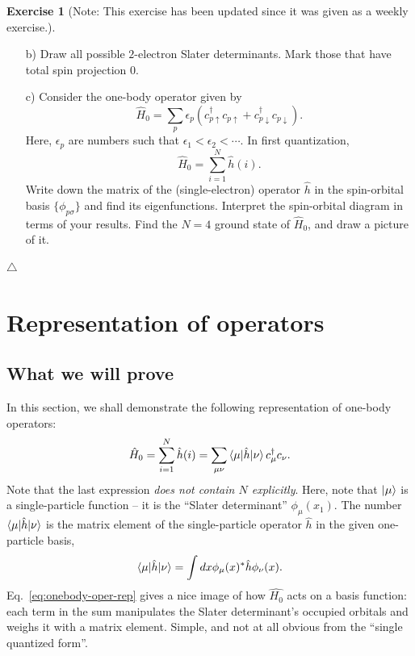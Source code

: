 \documentclass{report}
\theoremstyle{plain}
\theoremstyle{definition}
\newtheorem{exerc}{Exercise}[chapter]
\newcommand\xqed[1]{%
  \leavevmode\unskip\penalty9999 \hbox{}\nobreak\hfill
  \quad\hbox{#1}}
\newcommand\demo{\xqed{$\triangle$}}
\newenvironment{exercise}{\bigskip\begin{exerc}}{\demo\end{exerc}\bigskip}
\begin{document}
\begin{exercise}[Note: This exercise has been
  updated since it was given as a weekly exercise.]
  \begin{enumerate}
  \item[b)] Draw all possible $2$-electron Slater determinants. Mark those
    that have total spin projection 0.
  \item[c)] Consider the one-body operator given by
    \[ \hat{H}_0 = \sum_{p} \epsilon_p (c^\dag_{p\uparrow} c_{p\uparrow}
  + c^\dag_{p\downarrow} c_{p\downarrow}). \]  
  Here, $\epsilon_p$ are numbers such that $\epsilon_1 < \epsilon_2 < \cdots$.
  In first quantization,
  \[ \hat{H}_0 = \sum_{i=1}^N \hat{h}(i). \] Write down the matrix of
  the (single-electron) operator $\hat{h}$ in the spin-orbital basis
  $\{\phi_{p\sigma}\}$ and find its eigenfunctions. Interpret the
  spin-orbital diagram in terms of your results. Find the $N=4$ ground
  state of $\hat{H}_0$, and draw a picture of it.
\end{enumerate}
\end{exercise}

\section{Representation of operators}

\subsection{What we will prove}


In this section, we shall demonstrate the following representation of
one-body operators:
\begin{equation}
  \hat{H}_0 = \sum_{i=1}^N \hat{h}(i) = \sum_{\mu\nu}
  \braket{\mu|\hat{h}|\nu} c^\dag_\mu
  c_\nu.\label{eq:onebody-operator-rep} 
\end{equation}
Note that the last expression \emph{does not contain $N$ explicitly}.
Here, note that $\ket{\mu}$ is a single-particle function -- it is the
``Slater determinant'' $\phi_\mu(x_1)$. The number
$\braket{\mu|\hat{h}|\nu}$ is the matrix element of the
single-particle operator $\hat{h}$ in the given one-particle basis,
\begin{equation}
  \braket{\mu|\hat{h}|\nu} = \int dx \phi_\mu(x)^* \hat{h}
  \phi_\nu(x).
\end{equation}
Eq.~\eqref{eq:onebody-oper-rep} gives a nice image of how
$\hat{H_0}$ acts on a basis function: each term in the sum manipulates
the Slater determinant's occupied orbitals and weighs it with a matrix
element. Simple, and not at all obvious from the ``single quantized
form''. 
\end{document}
